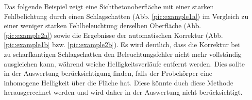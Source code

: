 \documentclass{article}
\begin{document}
Das folgende Beispiel zeigt eine Sichtbetonoberfläche mit einer starken Fehlbelichtung durch einen Schlagschatten (Abb. \ref{pic:example1a}) im Vergleich zu einer weniger starken Fehlbeleuchtung derselben Oberfläche (Abb. \ref{pic:example2a}) sowie die Ergebnisse der automatischen Korrektur (Abb. \ref{pic:example1b} bzw. \ref{pic:example2b}). Es wird deutlich, dass die Korrektur bei zu scharfkantigen Schlagschatten den Beleuchtungsfehler nicht mehr vollständig ausgleichen kann, während weiche Helligkeitsverläufe entfernt werden. Dies sollte in der Auswertung berücksichtigung finden, falls der Probekörper eine inhomogene Helligkeit über die Fläche hat. Diese könnte duch diese Methode herausgerechnet werden und wird daher in der Auswertung nicht berücksichtigt.

\begin{figure}[htbp]
	\centering
\end{figure}
\end{document}

